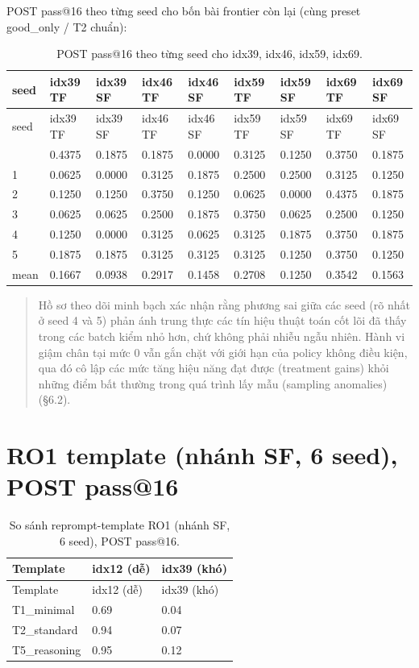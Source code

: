 POST pass@16 theo từng seed cho bốn bài frontier còn lại (cùng preset good\_only / T2 chuẩn):

\begin{longtable}{lllllllll}
\caption{POST pass@16 theo từng seed cho idx39, idx46, idx59, idx69.}\\
\toprule
seed & idx39 TF & idx39 SF & idx46 TF & idx46 SF & idx59 TF & idx59 SF & idx69 TF & idx69 SF \\
\midrule
\endfirsthead
\toprule
seed & idx39 TF & idx39 SF & idx46 TF & idx46 SF & idx59 TF & idx59 SF & idx69 TF & idx69 SF \\
\midrule
\endhead
\bottomrule
\endfoot
0 & 0.4375 & 0.1875 & 0.1875 & 0.0000 & 0.3125 & 0.1250 & 0.3750 & 0.1875 \\
1 & 0.0625 & 0.0000 & 0.3125 & 0.1875 & 0.2500 & 0.2500 & 0.3125 & 0.1250 \\
2 & 0.1250 & 0.1250 & 0.3750 & 0.1250 & 0.0625 & 0.0000 & 0.4375 & 0.1875 \\
3 & 0.0625 & 0.0625 & 0.2500 & 0.1875 & 0.3750 & 0.0625 & 0.2500 & 0.1250 \\
4 & 0.1250 & 0.0000 & 0.3125 & 0.0625 & 0.3125 & 0.1875 & 0.3750 & 0.1875 \\
5 & 0.1875 & 0.1875 & 0.3125 & 0.3125 & 0.3125 & 0.1250 & 0.3750 & 0.1250 \\
mean & 0.1667 & 0.0938 & 0.2917 & 0.1458 & 0.2708 & 0.1250 & 0.3542 & 0.1563 \\
\end{longtable}

\begin{quote}
Hồ sơ theo dõi minh bạch xác nhận rằng phương sai giữa các seed (rõ nhất ở seed 4 và 5) phản ánh trung thực các tín hiệu thuật toán cốt lõi đã thấy trong các batch kiểm nhỏ hơn, chứ không phải nhiễu ngẫu nhiên. Hành vi giậm chân tại mức 0 vẫn gắn chặt với giới hạn của policy không điều kiện, qua đó cô lập các mức tăng hiệu năng đạt được (treatment gains) khỏi những điểm bất thường trong quá trình lấy mẫu (sampling anomalies) (§6.2).
\end{quote}

\section{RO1 template (nhánh SF, 6 seed), POST pass@16}\label{e.4-rq1-template-sf-arm-6-seeds-post-pass16}

\begin{longtable}{lll}
\caption{So sánh reprompt-template RO1 (nhánh SF, 6 seed), POST pass@16.}\\
\toprule
Template & idx12 (dễ) & idx39 (khó) \\
\midrule
\endfirsthead
\toprule
Template & idx12 (dễ) & idx39 (khó) \\
\midrule
\endhead
\bottomrule
\endfoot
T1\_minimal & 0.69 & 0.04 \\
T2\_standard & 0.94 & 0.07 \\
T5\_reasoning & 0.95 & 0.12 \\
\end{longtable}

